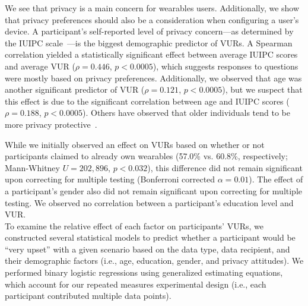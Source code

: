 \documentclass[conference]{IEEEtran}
\begin{document}
We see that privacy is a main concern for wearables users. Additionally, we show that privacy preferences should also be a consideration when configuring a user's device. A participant's self-reported level of privacy concern---as determined by the IUIPC scale~\cite{malhotra2004internet}---is the biggest demographic predictor of VURs. A Spearman correlation yielded a statistically significant effect between average IUIPC scores and average VUR ($\rho=0.446$, $p<0.0005$), which suggests responses to questions were mostly based on privacy preferences. Additionally, we observed that age was another significant predictor of VUR ($\rho=0.121$, $p<0.0005$), but we suspect that this effect is due to the significant correlation between age and IUIPC scores ($\rho=0.188$, $p<0.0005$). Others have observed that older individuals tend to be more privacy protective~\cite{varian2005demographics}.

While we initially observed an effect on VURs based on whether or not participants claimed to already own wearables (57.0\% vs. 60.8\%, respectively; Mann-Whitney $U=202,896$, $p<0.032$), this difference did not remain significant upon correcting for multiple testing (Bonferroni corrected $\alpha=0.01$). The effect of a participant's gender also did not remain significant upon correcting for multiple testing. We observed no correlation between a participant's education level and VUR.\\

\label{sec:regression}
To examine the relative effect of each factor on participants' VURs, we constructed several statistical models to predict whether a participant would be ``very upset'' with a given scenario based on the data type, data recipient, and their demographic factors (i.e., age, education, gender, and privacy attitudes). We performed binary logistic regressions using generalized estimating equations, which account for our repeated measures experimental design (i.e., each participant contributed multiple data points).
\end{document}
